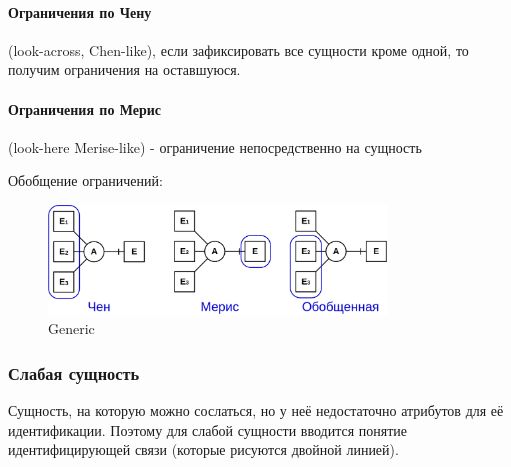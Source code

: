 \paragraph{Ограничения по Чену} (look-across, Chen-like), если зафиксировать все сущности кроме
одной, то получим ограничения на оставшуюся.

\paragraph{Ограничения по Мерис} (look-here Merise-like) - ограничение непосредственно на сущность

Обобщение ограничений:
\begin{figure}[h]
	\centering

	\includegraphics[width=0.8\textwidth]{../assets/kgeorgiy/modelling/ERModel_Multi_Generic.svg.png}
	\caption{Generic}
\end{figure}

\subsubsection{Слабая сущность}
Сущность, на которую можно сослаться, но у неё недостаточно атрибутов для её идентификации. Поэтому для слабой сущности вводится понятие идентифицирующей связи (которые рисуются двойной линией).
